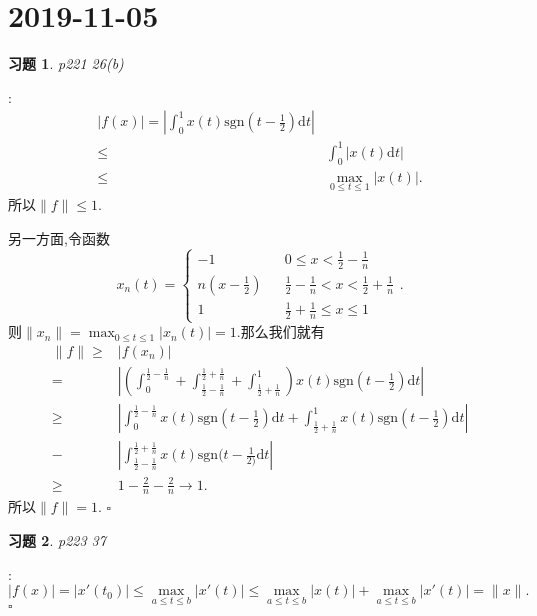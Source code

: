 \documentclass[a4paper]{article}
\newtheorem*{exe}{习题}
\newenvironment{sol}{{\noindent\bfseries 解}:}{\hfill $\square$\par}
\begin{document}
\section{2019-11-05}
\begin{exe}
  p221 26(b)
\end{exe} 
\begin{sol}
  \begin{align*}
    \left| f(x) \right| =\left| \int_0^{1}x(t)\text{sgn}(t-\frac{1}{2})\mathrm{d}t \right|\\
    \le & \int_0^{1}\left| x(t)\mathrm{d}t \right| \\
    \le & \max_{0\le t\le 1}\left| x(t) \right| 
  .\end{align*}
  所以$\|f\|\le 1$.

  另一方面,令函数
  \[
    x_n(t)=\left\{\begin{array}{lcr}
	-1 & & {0\le x<\frac{1}{2}-\frac{1}{n}}\\
	n(x-\frac{1}{2}) & &  \frac{1}{2}-\frac{1}{n}<x<\frac{1}{2}+\frac{1}{n}\\
	1 & &  \frac{1}{2}+\frac{1}{n}\le x\le 1
      \end{array}\right.
  .\]
  则$\|x_n\|=\max_{0\le t\le 1}\left| x_n(t) \right| =1$.那么我们就有
  \begin{align*}
    \|f\|\ge & \left| f(x_n) \right|\\
    = & \left| \left( \int_{0}^{\frac{1}{2}-\frac{1}{n}}+\int_{\frac{1}{2}-\frac{1}{n}}^{\frac{1}{2}+\frac{1}{n}}+\int_{\frac{1}{2}+\frac{1}{n}}^{1} \right)x(t)\text{sgn}(t-\frac{1}{2})\mathrm{d}t\right|\\
    \ge & \left| \int_{0}^{\frac{1}{2}-\frac{1}{n}}x(t)\text{sgn}(t-\frac{1}{2})\mathrm{d}t+\int_{\frac{1}{2}+\frac{1}{n}}^{1}x(t)\text{sgn}(t-\frac{1}{2})\mathrm{d}t \right|\\
    - & \left| \int_{\frac{1}{2}-\frac{1}{n}}^{\frac{1}{2}+\frac{1}{n}}x(t)\text{sgn}(t-\frac{1}{2)}\mathrm{d}t \right|\\ 
    \ge & 1-\frac{2}{n}-\frac{2}{n}\to 1 
  .\end{align*}
  所以$\|f\|=1$.
\end{sol}
\begin{exe}
  p223 37	
\end{exe}
\begin{sol}
  \[
    \left| f(x) \right| =\left| x'(t_0) \right| \le \max_{a\le t\le b}\left| x'(t) \right| \le \max_{a\le t\le b}\left| x(t) \right|+\max_{a\le t\le b}\left| x'(t) \right| =\|x\| 
  .\] 
\end{sol}
\end{document}
